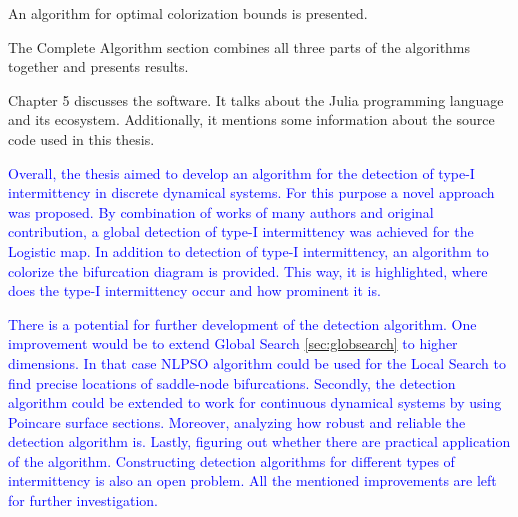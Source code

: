 An algorithm for optimal colorization bounds is presented.
\par
The Complete Algorithm section combines all three parts of the algorithms together and presents results.
\par
Chapter 5 discusses the software.
It talks about the Julia programming language and its ecosystem.
Additionally, it mentions some information about the source code used in this thesis.
\par
\textcolor{blue}{
Overall, the thesis aimed to develop an algorithm for the detection of type-I intermittency in discrete dynamical systems.
For this purpose a novel approach was proposed.
By combination of works of many authors and original contribution, a global detection of type-I intermittency was achieved for the Logistic map.
In addition to detection of type-I intermittency, an algorithm to colorize the bifurcation diagram is provided.
This way, it is highlighted, where does the type-I intermittency occur and how prominent it is.
}
\par
\textcolor{blue}{
There is a potential for further development of the detection algorithm.
One improvement would be to extend Global Search \ref{sec:globsearch} to higher dimensions.
In that case NLPSO algorithm could be used for the Local Search to find precise locations of saddle-node bifurcations.
Secondly, the detection algorithm could be extended to work for continuous dynamical systems by using Poincare surface sections.
Moreover, analyzing how robust and reliable the detection algorithm is.
Lastly, figuring out whether there are practical application of the algorithm.
Constructing detection algorithms for different types of intermittency is also an open problem.
All the mentioned improvements are left for further investigation.
}

\endinput